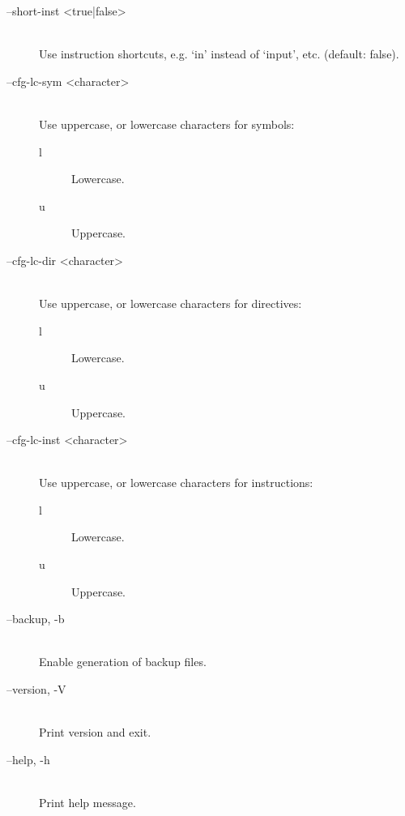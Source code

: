 \begin{description}
                \item[--short-inst <true|false>]~\\
                    Use instruction shortcuts, e.g. `in' instead of `input', etc. (default: false).

                \item[--cfg-lc-sym <character>]~\\
                    Use uppercase, or lowercase characters for symbols:
                    \begin{description}
                        \item [l] Lowercase.
                        \item [u] Uppercase.
                    \end{description}

                \item[--cfg-lc-dir <character>]~\\
                    Use uppercase, or lowercase characters for directives:
                    \begin{description}
                        \item [l] Lowercase.
                        \item [u] Uppercase.
                    \end{description}

                \item[--cfg-lc-inst <character>]~\\
                    Use uppercase, or lowercase characters for instructions:
                    \begin{description}
                        \item [l] Lowercase.
                        \item [u] Uppercase.
                    \end{description}

                \item[--backup, -b]~\\
                    Enable generation of backup files.

                \item[--version, -V]~\\
                    Print version and exit.

                \item[--help, -h]~\\
                    Print help message.
            \end{description}

